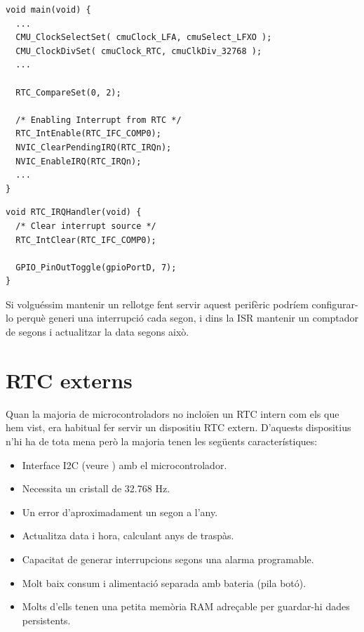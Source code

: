 \begin{lstlisting}[style=customc, caption={Inicialització del RTC}, label=RTCInit]
void main(void) {
  ...
  CMU_ClockSelectSet( cmuClock_LFA, cmuSelect_LFXO );
  CMU_ClockDivSet( cmuClock_RTC, cmuClkDiv_32768 );
  ...

  RTC_CompareSet(0, 2);

  /* Enabling Interrupt from RTC */
  RTC_IntEnable(RTC_IFC_COMP0);
  NVIC_ClearPendingIRQ(RTC_IRQn);
  NVIC_EnableIRQ(RTC_IRQn);
  ...
}
\end{lstlisting}

\begin{lstlisting}[style=customc,caption={ISR del RTC},label=RTCISR]
void RTC_IRQHandler(void) {
  /* Clear interrupt source */
  RTC_IntClear(RTC_IFC_COMP0);

  GPIO_PinOutToggle(gpioPortD, 7);
}
\end{lstlisting}


Si volguéssim mantenir un rellotge fent servir aquest perifèric podríem configurar-lo perquè generi una interrupció cada segon, i dins la \gls{ISR} mantenir un comptador de segons i actualitzar la data segons això.

\section{RTC externs}
Quan la majoria de microcontroladors no incloïen un RTC intern com els que hem vist, era habitual fer servir un dispositiu \gls{RTC} extern. D'aquests dispositius n'hi ha de tota mena però la majoria tenen les següents característiques:

\begin{itemize}
 \item Interface \gls{I2C} (veure ) amb el microcontrolador.
 \item Necessita un cristall de 32.768 Hz.
 \item Un error d'aproximadament un segon a l'any.
 \item Actualitza data i hora, calculant anys de traspàs.
 \item Capacitat de generar interrupcions segons una alarma programable.
 \item Molt baix consum i alimentació separada amb bateria (pila botó).
 \item Molts d'ells tenen una petita memòria RAM adreçable per guardar-hi dades persistents.
\end{itemize}


